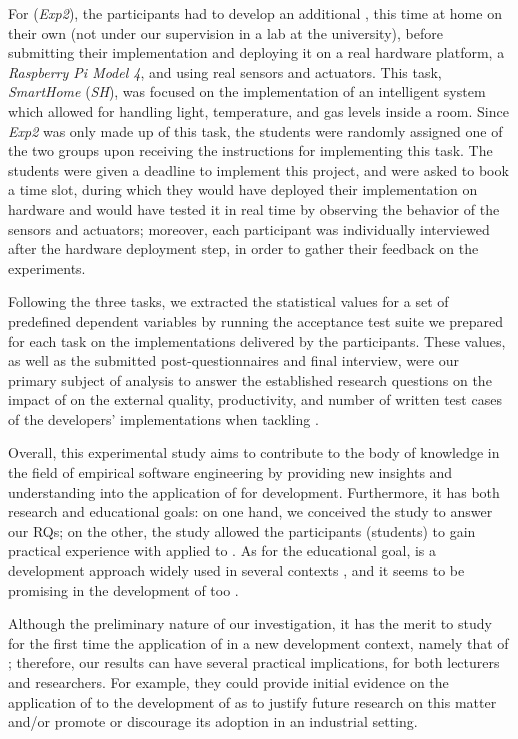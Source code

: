 For (\textit{Exp2}), the participants had to develop an additional \es, this time at home on their own (\ie not under our supervision in a lab at the university), before submitting their implementation and deploying it on a real hardware platform, a \textit{Raspberry Pi Model 4}, and using real sensors and actuators. This task, \textit{SmartHome} (\textit{SH}), was focused on the implementation of an intelligent system which allowed for handling light, temperature, and gas levels inside a room.
Since \textit{Exp2} was only made up of this task, the students were randomly assigned one of the two groups upon receiving the instructions for implementing this task.
The students were given a deadline to implement this project, and were asked to book a time slot, during which they would have deployed their implementation on hardware and would have tested it in real time by observing the behavior of the sensors and actuators; moreover, each participant was individually interviewed after the hardware deployment step, in order to gather their feedback on the experiments.

Following the three tasks, we extracted the statistical values for a set of predefined dependent variables by running the acceptance test suite we prepared for each task on the implementations delivered by the participants. These values, as well as the submitted post-questionnaires and final interview, were our primary subject of analysis to answer the established research questions on the impact of \tdd on the external quality, productivity, and number of written test cases of the developers' implementations when tackling \ess.

Overall, this experimental study aims to contribute to the body of knowledge in the field of empirical software engineering by providing new insights and understanding into the application of \tdd for \es development. Furthermore, it has both research and educational goals: on one hand, we conceived the study to answer our RQs; on the other, the study allowed the participants (students) to gain practical experience with \tdd applied to \ess. As for the educational goal, \tdd is a development approach widely used in several contexts \cite{DBLP:conf/esem/RomanoZBPS22}, and it seems to be promising in the development of \ess too \cite{TDDEC}.

Although the preliminary nature of our investigation, it has the merit to study for the first time the application of \tdd in a new development context, namely that of \ess; therefore, our results can have several practical implications, for both lecturers and researchers. For example, they could provide initial evidence on the application of \tdd to the development of \ess as to justify future research on this matter and/or promote or discourage its adoption in an industrial setting.




